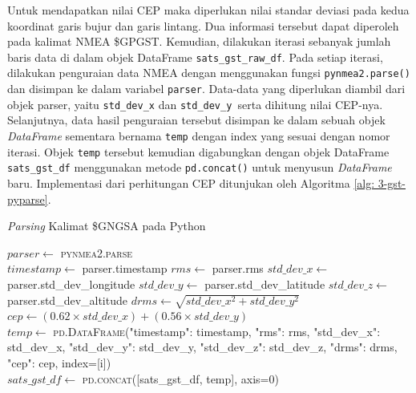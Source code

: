 Untuk mendapatkan nilai CEP maka diperlukan nilai standar deviasi pada kedua koordinat garis bujur dan garis lintang. Dua informasi tersebut dapat diperoleh pada kalimat NMEA \$GPGST. Kemudian, dilakukan iterasi sebanyak jumlah baris data di dalam objek DataFrame \texttt{sats\_gst\_raw\_df}. Pada setiap iterasi, dilakukan penguraian data NMEA dengan menggunakan fungsi \texttt{pynmea2.parse()} dan disimpan ke dalam variabel \texttt{parser}. Data-data yang diperlukan diambil dari objek parser, yaitu \texttt{std\_dev\_x} dan \texttt{std\_dev\_y }serta dihitung nilai CEP-nya. Selanjutnya, data hasil penguraian tersebut disimpan ke dalam sebuah objek \textit{DataFrame} sementara bernama \texttt{temp} dengan index yang sesuai dengan nomor iterasi. Objek \texttt{temp} tersebut kemudian digabungkan dengan objek DataFrame \texttt{sats\_gst\_df} menggunakan metode \texttt{pd.concat()} untuk menyusun \textit{DataFrame} baru. Implementasi dari perhitungan CEP ditunjukan oleh Algoritma \ref{alg: 3-gst-pyparse}.

\begin{algorithm}[H]
	\caption{\textit{Parsing} Kalimat \$GNGSA pada Python}
	\label{alg: 3-gst-pyparse}
	\begin{algorithmic}[1]
		\State $parser \gets$ \textsc{pynmea2.parse}
		\\
		\State $timestamp \gets$ parser.timestamp
		\State $rms \gets$ parser.rms
		\State $std\_dev\_x \gets$ parser.std\_dev\_longitude
		\State $std\_dev\_y \gets$ parser.std\_dev\_latitude
		\State $std\_dev\_z \gets$ parser.std\_dev\_altitude
		\State $drms \gets \sqrt{std\_dev\_x^2 + std\_dev\_y^2}$
		\\
		\State $cep \gets (0.62 \times std\_dev\_x) + (0.56 \times std\_dev\_y)$
		\\
		\State $temp \gets$ \textsc{pd.DataFrame}({"timestamp": timestamp, "rms": rms, "std\_dev\_x": std\_dev\_x, "std\_dev\_y": std\_dev\_y, "std\_dev\_z": std\_dev\_z, "drms": drms, "cep": cep}, index=[i])
		\\
		\State $sats\_gst\_df \gets$ \textsc{pd.concat}([sats\_gst\_df, temp], axis=0)
	\EndFor
	\end{algorithmic}
\end{algorithm}

